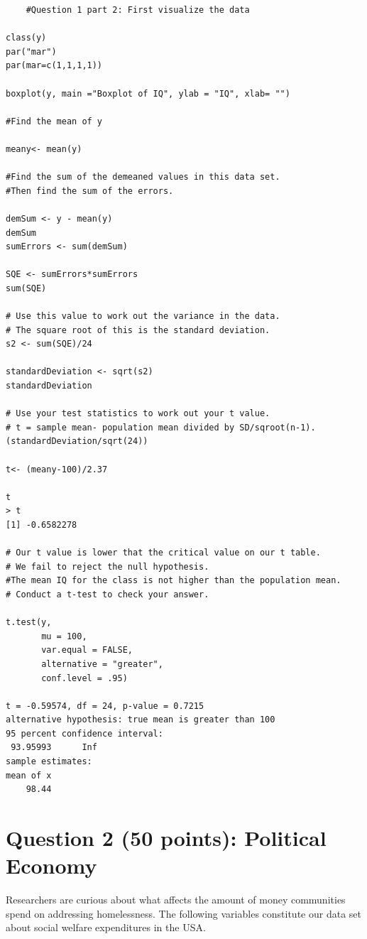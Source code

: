 \documentclass[12pt,letterpaper]{article}
\begin{document}
\begin{verbatim}
    #Question 1 part 2: First visualize the data

class(y)
par("mar")
par(mar=c(1,1,1,1))

boxplot(y, main ="Boxplot of IQ", ylab = "IQ", xlab= "")

#Find the mean of y

meany<- mean(y)

#Find the sum of the demeaned values in this data set. 
#Then find the sum of the errors.

demSum <- y - mean(y)
demSum
sumErrors <- sum(demSum)

SQE <- sumErrors*sumErrors
sum(SQE)

# Use this value to work out the variance in the data. 
# The square root of this is the standard deviation.
s2 <- sum(SQE)/24

standardDeviation <- sqrt(s2)
standardDeviation

# Use your test statistics to work out your t value.
# t = sample mean- population mean divided by SD/sqroot(n-1).
(standardDeviation/sqrt(24))

t<- (meany-100)/2.37

t
> t
[1] -0.6582278

# Our t value is lower that the critical value on our t table.
# We fail to reject the null hypothesis. 
#The mean IQ for the class is not higher than the population mean.
# Conduct a t-test to check your answer.

t.test(y,
       mu = 100, 
       var.equal = FALSE, 
       alternative = "greater", 
       conf.level = .95)

t = -0.59574, df = 24, p-value = 0.7215
alternative hypothesis: true mean is greater than 100
95 percent confidence interval:
 93.95993      Inf
sample estimates:
mean of x 
    98.44 
\end{verbatim}

\newpage

	\section*{Question 2 (50 points): Political Economy}

\noindent Researchers are curious about what affects the amount of money communities spend on addressing homelessness. The following variables constitute our data set about social welfare expenditures in the USA. \\
\vspace{.5cm}
\end{document}
